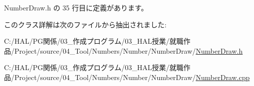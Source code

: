  Number\+Draw.\+h の 35 行目に定義があります。



このクラス詳解は次のファイルから抽出されました\+:\begin{DoxyCompactItemize}
\item 
C\+:/\+H\+A\+L/\+P\+G関係/03\+\_\+作成プログラム/03\+\_\+\+H\+A\+L授業/就職作品/\+Project/source/04\+\_\+\+Tool/\+Numbers/\+Number/\+Number\+Draw/\mbox{\hyperlink{_number_draw_8h}{Number\+Draw.\+h}}\item 
C\+:/\+H\+A\+L/\+P\+G関係/03\+\_\+作成プログラム/03\+\_\+\+H\+A\+L授業/就職作品/\+Project/source/04\+\_\+\+Tool/\+Numbers/\+Number/\+Number\+Draw/\mbox{\hyperlink{_number_draw_8cpp}{Number\+Draw.\+cpp}}\end{DoxyCompactItemize}
